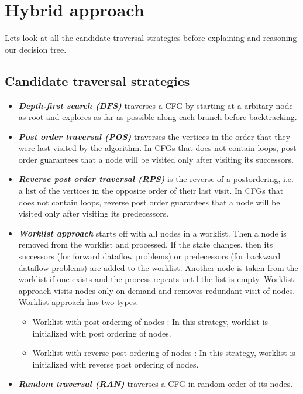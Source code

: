\section{Hybrid approach}
\label{sec:hybrid-approach}
Lets look at all the candidate traversal strategies before explaining and
reasoning our decision tree.



\subsection{Candidate traversal strategies}
\label{sec:candidate-traversals}
\begin{itemize}
\item \textbf{\textit{Depth-first search (DFS)}} traverses a CFG by starting at
a arbitary node as root and explores as far as possible along each branch before
backtracking.\newline
\item \textbf{\textit{Post order traversal (POS)}} traverses the vertices in the
order that they were last visited by the algorithm. In CFGs that does not
contain loops, post order guarantees that a node will be visited only after
visiting its successors.
\item \textbf{\textit{Reverse post order traversal (RPS)}} is the reverse of a
postordering, i.e. a list of the vertices in the opposite order of their last
visit. In CFGs that does not contain loops, reverse post order guarantees that a
node will be visited only after visiting its predecessors.
\item \textbf{\textit{Worklist approach}} starts off with all nodes in a
worklist. Then a node is removed from the worklist and processed. If the state
changes, then its successors (for forward dataflow problems) or predecessors
(for backward dataflow problems) are added to the worklist.  Another node is
taken from the worklist if one exists and the process repeats until the list is
empty. Worklist approach visits nodes only on demand and removes redundant visit
of nodes. Worklist approach has two types.
\begin{itemize}
\item Worklist with post ordering of nodes : In this strategy,  worklist is
initialized with post ordering of nodes.
\item Worklist with reverse post ordering of nodes : In this strategy,  worklist
is initialized with reverse post ordering of nodes.
\end{itemize}
\item \textbf{\textit{Random traversal (RAN)}} traverses a CFG in random order
of its nodes.
\end{itemize}
